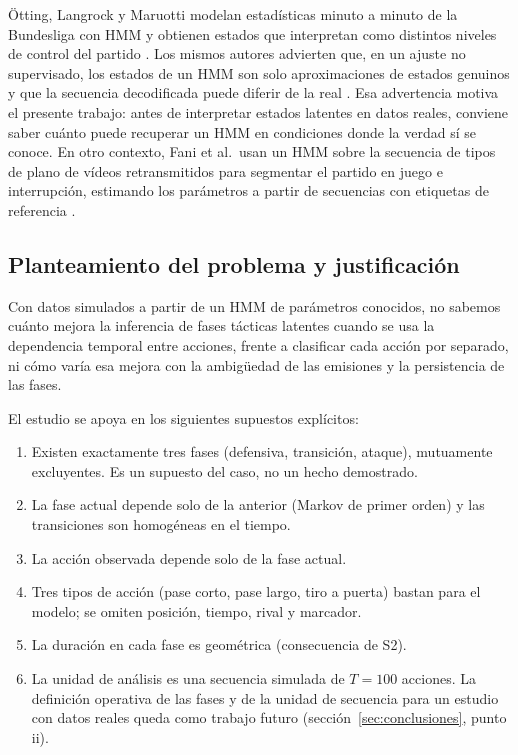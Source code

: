 \documentclass[11pt,a4paper]{article}
\begin{document}
Ötting, Langrock y Maruotti modelan estadísticas minuto a minuto de la
Bundesliga con HMM y obtienen estados que interpretan como distintos niveles de
control del partido \cite[pp.~9, 20]{otting2023}. Los mismos autores advierten
que, en un ajuste no supervisado, los estados de un HMM son solo aproximaciones
de estados genuinos y que la secuencia decodificada puede diferir de la real
\cite[p.~23]{otting2023}. Esa advertencia motiva el presente trabajo: antes de
interpretar estados latentes en datos reales, conviene saber cuánto puede
recuperar un HMM en condiciones donde la verdad sí se conoce. En otro contexto,
Fani et al.\ usan un HMM sobre la secuencia de tipos de plano de vídeos
retransmitidos para segmentar el partido en juego e interrupción, estimando los
parámetros a partir de secuencias con etiquetas de referencia
\cite[pp.~27324, 27329--27330]{fani2017}.

\subsection{Planteamiento del problema y justificación}

Con datos simulados a partir de un HMM de parámetros conocidos, no sabemos
cuánto mejora la inferencia de fases tácticas latentes cuando se usa la
dependencia temporal entre acciones, frente a clasificar cada acción por
separado, ni cómo varía esa mejora con la ambigüedad de las emisiones y la
persistencia de las fases.

El estudio se apoya en los siguientes supuestos explícitos:
\begin{enumerate}[label=S\arabic*.]
  \item Existen exactamente tres fases (defensiva, transición, ataque),
        mutuamente excluyentes. Es un supuesto del caso, no un hecho demostrado.
  \item La fase actual depende solo de la anterior (Markov de primer orden) y
        las transiciones son homogéneas en el tiempo.
  \item La acción observada depende solo de la fase actual.
  \item Tres tipos de acción (pase corto, pase largo, tiro a puerta) bastan para
        el modelo; se omiten posición, tiempo, rival y marcador.
  \item La duración en cada fase es geométrica (consecuencia de S2).
  \item La unidad de análisis es una secuencia simulada de $T=100$ acciones.
        La definición operativa de las fases y de la unidad de secuencia para
        un estudio con datos reales queda como trabajo futuro
        (sección~\ref{sec:conclusiones}, punto ii).
\end{enumerate}
\end{document}

